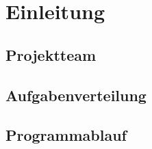 
\chapter{Einleitung}\label{ch:einleitung}
\section{Projektteam}\label{sec:projektteam}
\section{Aufgabenverteilung}\label{sec:aufgabenverteilung}
\section{Programmablauf}\label{sec:programmablauf}












